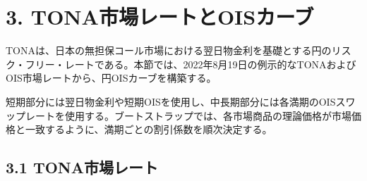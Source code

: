 \documentclass[
  letterpaper,
  DIV=11,
  numbers=noendperiod]{scrreprt}
\begin{document}
\section{3.
TONA市場レートとOISカーブ}\label{tonaux5e02ux5834ux30ecux30fcux30c8ux3068oisux30abux30fcux30d6}

TONAは、日本の無担保コール市場における翌日物金利を基礎とする円のリスク・フリー・レートである。本節では、2022年8月19日の例示的なTONAおよびOIS市場レートから、円OISカーブを構築する。

短期部分には翌日物金利や短期OISを使用し、中長期部分には各満期のOISスワップレートを使用する。ブートストラップでは、各市場商品の理論価格が市場価格と一致するように、満期ごとの割引係数を順次決定する。

\subsection{3.1
TONA市場レート}\label{tonaux5e02ux5834ux30ecux30fcux30c8}
\end{document}
